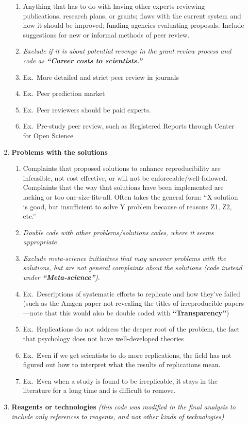 \documentclass[
]{scrartcl}
\begin{document}
\begin{enumerate}
  \begin{enumerate}

  \item
    Anything that has to do with having other experts reviewing
    publications, research plans, or grants; flaws with the current
    system and how it should be improved; funding agencies evaluating
    proposals. Include suggestions for new or informal methods of peer
    review.
  \item
    \emph{Exclude if it is about potential revenge in the grant review
    process and code as \textbf{``Career costs to scientists.''} }
  \item
    Ex.~More detailed and strict peer review in journals
  \item
    Ex.~Peer prediction market
  \item
    Ex.~Peer reviewers should be paid experts.
  \item
    Ex.~Pre-study peer review, such as Registered Reports through Center
    for Open Science
  \end{enumerate}
\item
  \textbf{Problems with the solutions}

  \begin{enumerate}

  \item
    Complaints that proposed solutions to enhance reproducibility are
    infeasible, not cost effective, or will not be
    enforceable/well-followed. Complaints that the way that solutions
    have been implemented are lacking or too one-size-fits-all. Often
    takes the general form: ``X solution is good, but insufficient to
    solve Y problem because of reasons Z1, Z2, etc.''
  \item
    \emph{Double code with other problems/solutions codes, where it
    seems appropriate}
  \item
    \emph{Exclude meta-science initiatives that may uncover problems
    with the solutions, but are not general complaints about the
    solutions (code instead under \textbf{``Meta-science''}).}
  \item
    Ex.~Descriptions of systematic efforts to replicate and how they've
    failed (such as the Amgen paper not revealing the titles of
    irreproducible papers---note that this would also be double coded
    with \textbf{``Transparency''})
  \item
    Ex.~Replications do not address the deeper root of the problem, the
    fact that psychology does not have well-developed theories
  \item
    Ex.~Even if we get scientists to do more replications, the field has
    not figured out how to interpret what the results of replications
    mean.
  \item
    Ex.~Even when a study is found to be irreplicable, it stays in the
    literature for a long time and is difficult to remove.
  \end{enumerate}
\item
  \textbf{Reagents or technologies} \emph{(this code was modified in the
  final analysis to include only references to reagents, and not other
  kinds of technologies)}


\end{enumerate}
\end{document}
